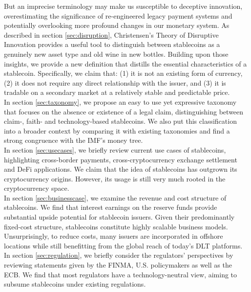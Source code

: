 \documentclass[conference]{IEEEtran}
\begin{document}
But an imprecise terminology may make us susceptible to deceptive innovation, overestimating the significance of re-engineered legacy payment systems and potentially overlooking more profound changes in our monetary system. As described in section \ref{sec:disruption}, Christensen's Theory of Disruptive Innovation provides a useful tool to distinguish between stablecoins as a genuinely new asset type and old wine in new bottles. Building upon those insights, we provide a new definition that distills the essential characteristics of a stablecoin. Specifically, we claim that: (1) it is not an existing form of currency, (2) it does not require any direct relationship with the issuer, and (3) it is tradable on a secondary market at a relatively stable and predictable price.\\

In section \ref{sec:taxonomy}, we propose an easy to use yet expressive taxonomy that focuses on the absence or existence of a legal claim, distinguishing between claim-, faith- and technology-based stablecoins. We also put this classification into a broader context by comparing it with existing taxonomies and find a strong congruence with the IMF's money tree.\\

In section \ref{sec:usecases}, we briefly review current use cases of stablecoins, highlighting cross-border payments, cross-cryptocurrency exchange settlement and \ac{DeFi} applications. We claim that the idea of stablecoins has outgrown its cryptocurrency origins. However, its usage is still very much rooted in the cryptocurrency space.\\

In section \ref{sec:businesscase}, we examine the revenue and cost structure of stablecoins. We find that interest earnings on the reserve funds provide substantial upside potential for stablecoin issuers. Given their predominantly fixed-cost structure, stablecoins constitute highly scalable business models. Unsurprisingly, to reduce costs, many issuers are incorporated in offshore locations while still benefitting from the global reach of today's \ac{DLT} platforms.\\

In section \ref{sec:regulation}, we briefly consider the regulators' perspectives by reviewing statements given by the \ac{FINMA}, U.S. policymakers as well as the \ac{ECB}. We find that most regulators have a technology-neutral view, aiming to subsume stablecoins under existing regulations.\\
\end{document}

